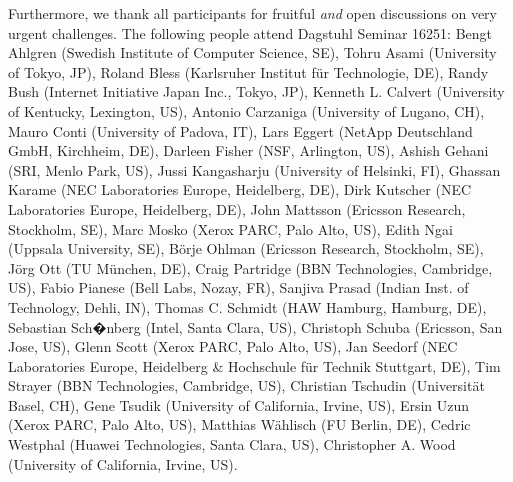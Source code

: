 \documentclass{sig-alternate-10pt}
\begin{document}
Furthermore, we thank all participants for fruitful \emph{and} open discussions
on very urgent challenges. The following people attend Dagstuhl Seminar 16251:
    Bengt Ahlgren (Swedish Institute of Computer Science, SE),
    Tohru Asami (University of Tokyo, JP),
    Roland Bless (Karlsruher Institut f\"ur Technologie, DE),
    Randy Bush (Internet Initiative Japan Inc., Tokyo, JP),
    Kenneth L. Calvert (University of Kentucky, Lexington, US),
    Antonio Carzaniga (University of Lugano, CH),
    Mauro Conti (University of Padova, IT),
    Lars Eggert (NetApp Deutschland GmbH, Kirchheim, DE),
    Darleen Fisher (NSF, Arlington, US),
    Ashish Gehani (SRI, Menlo Park, US),
    Jussi Kangasharju (University of Helsinki, FI),
    Ghassan Kar\-ame (NEC Laboratories Europe, Heidelberg, DE),
    Dirk Kut\-scher (NEC Laboratories Europe, Heidelberg, DE),
    John Mattsson (Ericsson Research, Stockholm, SE),
    Marc Mosko (Xerox PARC, Palo Alto, US),
    Edith Ngai (Uppsala University, SE),
    B\"orje Ohlman (Ericsson Research, Stockholm, SE),
    J\"org Ott (TU M\"unchen, DE),
    Craig Partridge (BBN Technologies, Cambridge, US),
    Fabio Pianese (Bell Labs, Nozay, FR),
    Sanjiva Prasad (Indian Inst. of Technology, Dehli, IN),
    Thomas C. Schmidt (HAW Hamburg, Hamburg, DE),
    Sebastian Sch�nberg (Intel, Santa Clara, US),
    Christoph Schuba (Ericsson, San Jose, US),
    Glenn Scott (Xerox PARC, Palo Alto, US),
    Jan Seedorf (NEC Laboratories Europe, Heidelberg \& Hochschule f\"ur Technik Stuttgart, DE),
    Tim Strayer (BBN Technologies, Cambridge, US),
    Christian Tschudin (Universit\"at Basel, CH),
    Gene Tsudik (University of California, Irvine, US),
    Ersin Uzun (Xerox PARC, Palo Alto, US),
    Matthias W\"ahlisch (FU Berlin, DE),
    Cedric Westphal (Huawei Technologies, Santa Clara, US),
    Christopher A. Wood (University of California, Irvine, US).

\small
\balance


\end{document}
